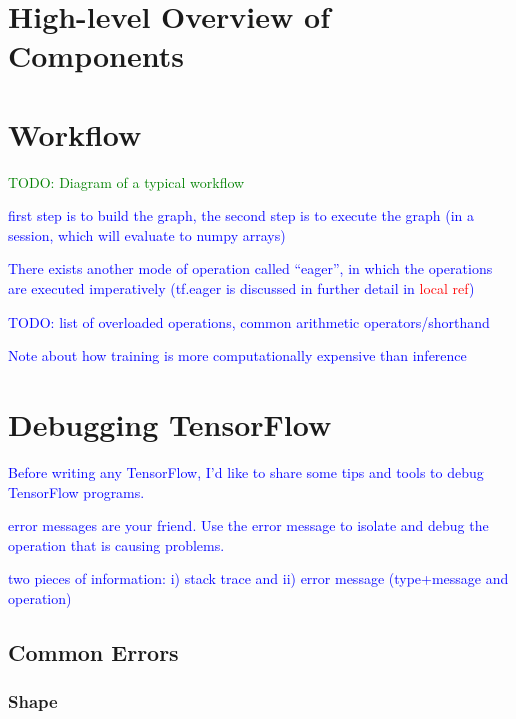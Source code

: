 \section{High-level Overview of Components}




\section{Workflow}

\textcolor{green}{TODO: Diagram of a typical workflow}

\textcolor{blue}{first step is to build the graph, the second step is to execute the graph (in a session, which will evaluate to numpy arrays)}

\textcolor{blue}{There exists another mode of operation called ``eager'', in which the operations are executed imperatively (tf.eager is discussed in further detail in \textcolor{red}{local ref})}

\textcolor{blue}{TODO: list of overloaded operations, common arithmetic operators/shorthand}

\textcolor{blue}{Note about how training is more computationally expensive than inference}

\section{Debugging TensorFlow}

\textcolor{blue}{Before writing any TensorFlow, I'd like to share some tips and tools to debug TensorFlow programs.}


\textcolor{blue}{error messages are your friend. Use the error message to isolate and debug the operation that is causing problems.}

\textcolor{blue}{two pieces of information: i) stack trace and ii) error message (type+message and operation) }

\subsection{Common Errors}
\subsubsection{Shape}

